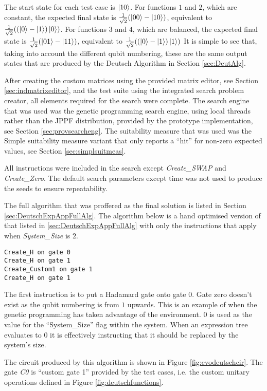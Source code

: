 The start state for each test case is $\left\vert{10}\right\rangle$.
For functions $1$ and $2$, which are constant, the expected final state is $\frac{1}{\sqrt{2}}(\left\vert{00}\right\rangle-\left\vert{10}\right\rangle)$, equivalent to $\frac{1}{\sqrt{2}}((\left\vert{0}\right\rangle-\left\vert{1}\right\rangle)\left\vert{0}\right\rangle)$.
For functions $3$ and $4$, which are balanced, the expected final state is $\frac{1}{\sqrt{2}}(\left\vert{01}\right\rangle-\left\vert{11}\right\rangle)$, equivalent to $\frac{1}{\sqrt{2}}((\left\vert{0}\right\rangle-\left\vert{1}\right\rangle)\left\vert{1}\right\rangle)$
It is simple to see that, taking into account the different qubit numbering, these are the same output states that are produced by the Deutsch Algorithm in Section \ref{sec:DeutAlg}.

After creating the custom matrices using the provided matrix editor, see Section \ref{sec:indmatrixeditor}, and the test suite using the integrated search problem creator, all elements required for the search were complete.
The search engine that was used was the genetic programming search engine, using local threads rather than the JPPF distribution, provided by the prototype implementation, see Section \ref{sec:provsearcheng}.
The suitability measure that was used was the Simple suitability measure variant that only reports a ``hit'' for non-zero expected values, see Section \ref{sec:simplsuitmeas}.

All instructions were included in the search except \emph{Create\_SWAP} and \emph{Create\_Zero}.
The default search parameters except time was not used to produce the seeds to ensure repeatability.

The full algorithm that was proffered as the final solution is listed in Section \ref{sec:DeutschExpAppFullAlg}.
The algorithm below is a hand optimised version of that listed in \ref{sec:DeutschExpAppFullAlg} with only the instructions that apply when \emph{System\_Size} is $2$.

\begin{lstlisting}
Create_H on gate 0
Create_H on gate 1
Create_Custom1 on gate 1
Create_H on gate 1
\end{lstlisting}

The first instruction is to put a Hadamard gate onto gate $0$.
Gate zero doesn't exist as the qubit numbering is from $1$ upwards.
This is an example of when the genetic programming has taken advantage of the environment.
$0$ is used as the value for the ``System\_Size'' flag within the system.
When an expression tree evaluates to $0$ it is effectively instructing that it should be replaced by the system's size.

The circuit produced by this algorithm is shown in Figure \ref{fig:evodeutschcir}.
The gate \emph{C0} is ``custom gate 1'' provided by the test cases, i.e. the custom unitary operations defined in Figure \ref{fig:deutschfunctions}.

